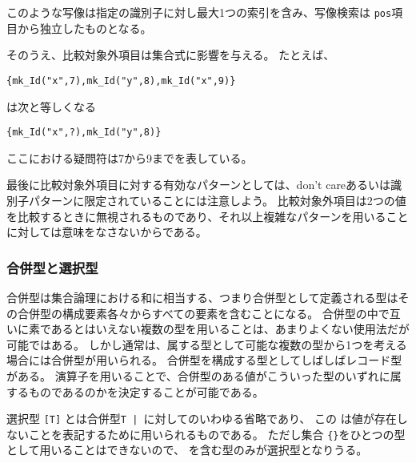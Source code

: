 \documentclass[\pformat,12pt]{jarticle}
\begin{document}
\begin{description}
このような写像は指定の識別子に対し最大1つの索引を含み、写像検索は {\tt pos}項目から独立したものとなる。

そのうえ、比較対象外項目は集合式に影響を与える。
たとえば、 
\begin{alltt}
  \{mk_Id("x",7),mk_Id("y",8),mk_Id("x",9)\}
\end{alltt}

は次と等しくなる

\begin{alltt}
  \{mk_Id("x",?),mk_Id("y",8)\}
\end{alltt}

ここにおける疑問符は7から9までを表している。

最後に比較対象外項目に対する有効なパターンとしては、don't careあるいは識別子パターンに限定されていることには注意しよう。
比較対象外項目は2つの値を比較するときに無視されるものであり、それ以上複雑なパターンを用いることに対しては意味をなさないからである。
\end{description}

\subsubsection{合併型と選択型}\label{unions}

合併型は集合論理における和に相当する、つまり合併型として定義される型はその合併型の構成要素各々からすべての要素を含むことになる。
合併型の中で互いに素であるとはいえない複数の型を用いることは、あまりよくない使用法だが可能ではある。 
しかし通常は、属する型として可能な複数の型から1つを考える場合には合併型が用いられる。 
合併型を構成する型としてしばしばレコード型がある。
演算子を用いることで、合併型のある値がこういった型のいずれに属するものであるのかを決定することが可能である。

選択型 {\tt [T]} とは合併型{\tt T | }に対してのいわゆる省略であり、 この は値が存在しないことを表記するために用いられるものである。
ただし集合 {\tt \{\}}をひとつの型として用いることはできないので、 を含む型のみが選択型となりうる。 
\end{document}
